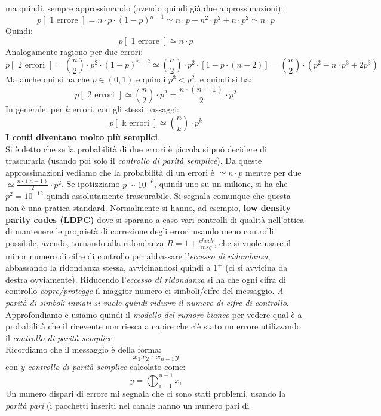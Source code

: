 \documentclass[a4paper,12pt, oneside]{book}
\begin{document}
ma quindi, sempre approssimando (avendo quindi già due approssimazioni):
\[p[\mbox{ 1 errore }]=n\cdot p\cdot(1-p)^{n-1}\simeq n\cdot p-n^2\cdot
  p^2+n\cdot p^2\simeq n\cdot p\]
Quindi:
\[p[\mbox{ 1 errore }]\simeq n\cdot p\]
Analogamente ragiono per due errori:
\[p[\mbox{ 2 errori }]={{n}\choose{2}}\cdot
  p^2\cdot(1-p)^{n-2}\simeq{{n}\choose{2}}\cdot
  p^2\cdot[1-p\cdot(n-2)]={{n}\choose{2}}\cdot (p^2-n\cdot p^3+2p^3)\]
Ma anche qui si ha che $p\in(0,1)$ e quindi $p^3<p^2$, e quindi si ha:
\[p[\mbox{ 2 errori }]\simeq{{n}\choose{2}}\cdot p^2=\frac{n\cdot
    (n-1)}{2}\cdot p^2\]
In generale, per $k$ errori, con gli stessi passaggi:
\[p[\mbox{ k errori }]\simeq{{n}\choose{k}}\cdot p^k\]
\textbf{I conti diventano molto più semplici}.\\
Si è detto che se la probabilità di due errori è piccola si può decidere di
trascurarla (usando poi solo il \textit{controllo di parità semplice}). Da
queste approssimazioni vediamo che la probabilità di un errori è $\simeq n\cdot
p$ mentre per due $\simeq\frac{n\cdot (n-1)}{2}\cdot p^2$. Se ipotizziamo $p\sim
10^{-6}$, quindi uno su un milione, si ha che $p^2=10^{-12}$ quindi assolutamente
trascurabile. Si segnala comunque che questa non è una pratica standard.
Normalmente si hanno, ad esempio, \textbf{low density parity codes (LDPC)} dove
si sparano a caso vari controlli di qualità nell'ottica di mantenere le
proprietà di correzione degli errori usando meno controlli possibile, avendo,
tornando alla ridondanza $R=1+\frac{check}{msg}$, che si vuole usare il minor
numero di cifre di controllo per abbassare l'\textit{eccesso di ridondanza},
abbassando la ridondanza stessa, avvicinandosi quindi a $1^+$ (ci si avvicina
da destra ovviamente). Riducendo l'\textit{eccesso di ridondanza} si ha che
ogni cifra di controllo \textit{copre/protegge} il maggior numero ci
simboli/cifre del messaggio. \textit{A parità di simboli inviati si vuole quindi
  ridurre il numero di cifre di controllo}.\\
Approfondiamo e usiamo quindi il\textit{ modello del rumore bianco} per vedere
qual è a probabilità che il ricevente non riesca a capire che c'è stato un
errore utilizzando il \textit{controllo di parità semplice}.\\
Ricordiamo che il messaggio è della forma:
\[x_1x_2\cdots x_{n-1}y\]
con $y$ \textit{controllo di parità semplice} calcolato come:
\[y=\bigoplus_{i=1}^{n-1}x_i\]
Un numero dispari di errore mi segnala che ci sono stati problemi, usando la
\textit{parità pari} (i pacchetti inseriti nel canale hanno un numero pari di
\end{document}
